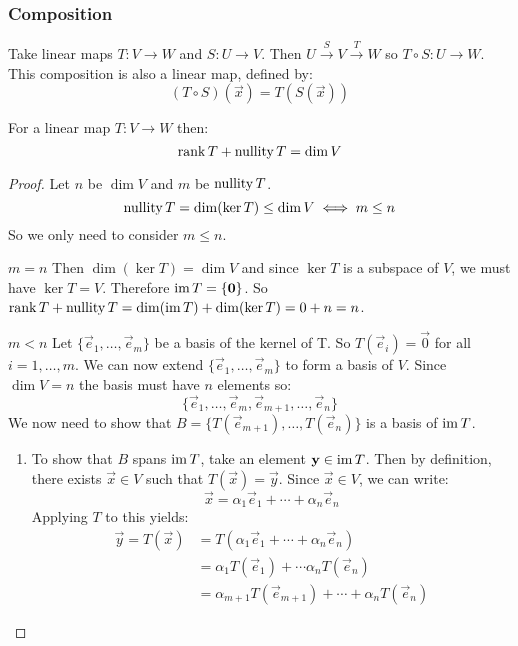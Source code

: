 \documentclass[../main.tex]{subfiles}
\begin{document}
\subsubsection{Composition}
Take linear maps $T: V \to W$ and $S: U \to V$.
Then $U \xrightarrow{S} V \xrightarrow{T} W$ so $T \circ S: U \to W$.
This composition is also a linear map, defined by:
\[
  (T \circ S)(\vec{x}) = T(S(\vec{x}))
\]
\begin{theorem}
  For a linear map $T: V \to W$ then:
  \[
    \operatorname{rank} T + \operatorname{nullity} T = \dim V
  \]
\end{theorem}
\begin{proof}
\nonexaminable
Let $n$ be $\dim V$ and $m$ be $\operatorname{nullity} T$.
\[
  \operatorname{nullity} T = \dim (\ker T) \leq \dim V \iff m \leq n
\]
So we only need to consider $m \leq n$.
\begin{proofcases}
  \begin{case}{$m = n$}
    Then $\dim(\ker T) = \dim V$ and since $\ker T$ is a subspace of $V$, we must have $\ker T = V$.
    Therefore $\operatorname{im} T = \{\boldsymbol{\mathbf{0}}\}$.
    So $\operatorname{rank} T + \operatorname{nullity} T = \dim(\operatorname{im} T) + \dim(\ker T) =0 + n = n$.
  \end{case}
  \begin{case}{$m < n$}
    Let $\{\vec{e}_1, \ldots, \vec{e}_m\}$ be a basis of the kernel of T.
    So $T(\vec{e}_i) = \vec{0}$ for all $i = 1, \ldots, m$.
    We can now extend $\{\vec{e}_1, \ldots, \vec{e}_m\}$ to form a basis of $V$.
    Since $\dim V = n$ the basis must have $n$ elements so:
    \[
      \{\vec{e}_1, \ldots, \vec{e}_m, \vec{e}_{m+1}, \ldots, \vec{e}_n\}
    \]
    We now need to show that $B = \{T(\vec{e}_{m + 1}), \ldots, T(\vec{e}_n)\}$ is a basis of $\operatorname{im} T$.
    \begin{enumerate}
      \item
      To show that $B$ spans $\operatorname{im} T$, take an element $\boldsymbol{\mathbf{y}} \in \operatorname{im} T$.
      Then by definition, there exists $\vec{x} \in V$ such that $T(\vec{x}) = \vec{y}$.
      Since $\vec{x} \in V$, we can write:
      \[
        \vec{x} = \alpha_1 \vec{e}_1 + \cdots + \alpha_n \vec{e}_n
      \]
      Applying $T$ to this yields:
      \begin{align*}
        \vec{y} = T(\vec{x}) &= T(\alpha_1 \vec{e}_1 + \cdots + \alpha_n \vec{e}_n) \\
                             &= \alpha_1 T(\vec{e}_1) + \cdots \alpha_n T(\vec{e}_n) \\
                             &= \alpha_{m + 1} T(\vec{e}_{m + 1}) + \cdots + \alpha_n T(\vec{e}_n)

\end{align*}
\end{enumerate}
\end{case}
\end{proofcases}
\end{proof}
\end{document}
